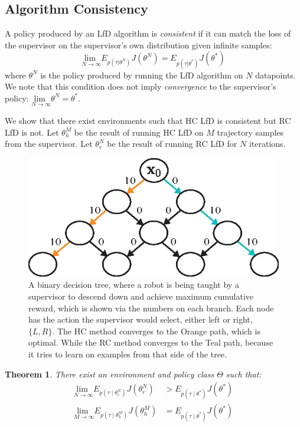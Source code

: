 \documentclass[10pt, conference]{ieeeconf}      %
\newtheorem{theorem}{Theorem}[section]
\newcommand{\ns}{HC LfD }
\newcommand{\nc}{RC LfD }
\begin{document}
\subsection{Algorithm Consistency}
A policy produced by an LfD algorithm is {\it consistent} if it can match the loss of the supervisor on the supervisor's own distribution given infinite samples:
$$\underset{N \rightarrow \infty}{\text{lim }} E_{p(\tau|\theta^N)}J(\theta^N)  = E_{p(\tau|\theta^*)}J(\theta^*) $$
\noindent where $\theta^N$ is the policy produced by running the LfD algorithm on $N$ datapoints.
We note that this condition does not imply {\it convergence} to the supervisor's policy: $\underset{N \rightarrow \infty}{\text{lim }} \theta^N = \theta^*$.

We show that there exist environments such that \ns is consistent but \nc is not.
Let $\theta_{h}^M$ be the result of running \ns on $M$ trajectory samples from the supervisor.
Let $\theta_{r}^N$ be the result of running \nc for $N$ iterations.

\begin{figure}
\centering
\includegraphics{f_figs/counter_exmp.eps}
\caption{
    \footnotesize
A binary decision tree, where a robot is being taught by a supervisor to descend down and achieve maximum cumulative reward, which is shown via the numbers on each branch. Each node has the action the supervisor would select, either left or right, $\lbrace L, R \rbrace$. The HC method converges to the Orange path, which is optimal. While the RC method converges to the Teal path, because it tries to learn on examples from that side of the tree.}
\vspace*{-20pt}
\label{fig:c_ex}
\end{figure}

\begin{theorem}
There exist an environment and policy class $\Theta$ such that:
\vspace{-2ex}
\begin{align*}
	\underset{N \rightarrow \infty}{\text{lim }} E_{p(\tau \mid \theta_{r}^N) } J(\theta_{r}^N) &> E_{p(\tau \mid \theta^*)} J(\theta^*) \\
	\underset{M \rightarrow \infty}{\text{lim }} E_{p(\tau \mid \theta_{h}^M) } J(\theta_{h}^M) &= E_{p(\tau \mid \theta^*)} J(\theta^*)
\end{align*} 
\end{theorem}
\end{document}
